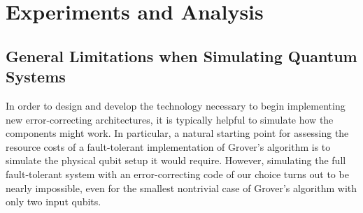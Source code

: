 \chapter{Experiments and Analysis}\label{chap:exp_and_analysis}








\section{General Limitations when Simulating Quantum Systems}\label{chap:simulation_limitations}
In order to design and develop the technology necessary to begin implementing new error-correcting architectures, it is typically helpful to simulate how the components might work. In particular, a natural starting point for assessing the resource costs of a fault-tolerant implementation of Grover's algorithm is to simulate the physical qubit setup it would require. However, simulating the full fault-tolerant system with an error-correcting code of our choice turns out to be nearly impossible, even for the smallest nontrivial case of Grover's algorithm with only two input qubits.

